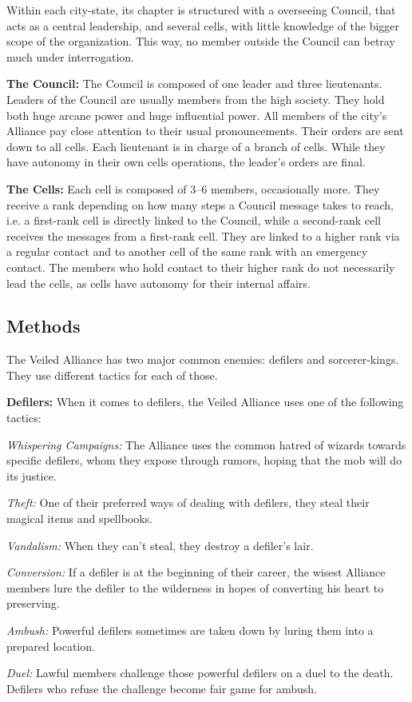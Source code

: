 Within each city-state, its chapter is structured with a overseeing Council, that acts as a central leadership, and several cells, with little knowledge of the bigger scope of the organization. This way, no member outside the Council can betray much under interrogation.

\textbf{The Council:} The Council is composed of one leader and three lieutenants. Leaders of the Council are usually members from the high society. They hold both huge arcane power and huge influential power. All members of the city's Alliance pay close attention to their usual pronouncements. Their orders are sent down to all cells. Each lieutenant is in charge of a branch of cells. While they have autonomy in their own cells operations, the leader's orders are final.

\textbf{The Cells:} Each cell is composed of 3--6 members, occasionally more. They receive a rank depending on how many steps a Council message takes to reach, i.e. a first-rank cell is directly linked to the Council, while a second-rank cell receives the messages from a first-rank cell. They are linked to a higher rank via a regular contact and to another cell of the same rank with an emergency contact. The members who hold contact to their higher rank do not necessarily lead the cells, as cells have autonomy for their internal affairs. 



\subsection{Methods}
The Veiled Alliance has two major common enemies: defilers and sorcerer-kings. They use different tactics for each of those.

\textbf{Defilers:} When it comes to defilers, the Veiled Alliance uses one of the following tactics:
\begin{enumerate*}
	\item \textit{Whispering Campaigns:} The Alliance uses the common hatred of wizards towards specific defilers, whom they expose through rumors, hoping that the mob will do its justice.
	\item \textit{Theft:} One of their preferred ways of dealing with defilers, they steal their magical items and spellbooks.
	\item \textit{Vandalism:} When they can't steal, they destroy a defiler's lair.
	\item \textit{Conversion:} If a defiler is at the beginning of their career, the wisest Alliance members lure the defiler to the wilderness in hopes of converting his heart to preserving.
	\item \textit{Ambush:} Powerful defilers sometimes are taken down by luring them into a prepared location.
	\item \textit{Duel:} Lawful members challenge those powerful defilers on a duel to the death. Defilers who refuse the challenge become fair game for ambush.
\end{enumerate*}

